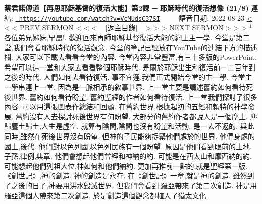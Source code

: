\documentclass{book}
\begin{document}
\section{}
\label{sec:VcMUdsC37SI}
\textbf{蔡君諾傳道【再思耶穌基督的復活大能】第2課 ─ 耶穌時代的復活想像 (21/8)}
\newline
\newline
連結: \href{https://youtube.com/watch?v=VcMUdsC37SI}{\texttt{ https://youtube.com/watch?v=VcMUdsC37SI}} ~~~~ 語音日期: 2022-08-23 
\newline
\newline
\hyperref[sec:MrgiW6jGDH4]{\small{< < < PREV SERMON < < <}}
~
\hyperref[sec:index]{\small{[返主目錄]}}
~
\hyperref[sec:A3YDD55lCCE]{\small{> > > NEXT SERMON > > >}}
\newline
\newline
$^{1}$各位弟兄姊妹,早晨!.
歡迎回來再師耶穌基督復活大能的網上主一學.
今堂是第二堂,我們會看耶穌時代的復活觀念.
今堂的筆記已經放在YouTube的連結下方的描述欄.
大家可以下載去看看今堂的內容.
今堂內容非常豐富,有三十多版的PowerPoint.
希望可以這一堂和大家去看看整個耶穌時代.
是關於耶穌出生和復活前一二百年到之後的時代.
人們如何去看待復活.
事不宜遲,我們正式開始今堂的主一學.
今堂主一學串連上一堂.
因為是一脈相承的敘事世界.
上一堂主要是講述舊約如何看待死後世界.
舊約如何看待盼望.
舊約聖經的作者如何看待復活.
上一堂我們探討了很多內容.
可以用這張圖表作總結和回顧.
在舊約世界,根據起初的五經和賴特的神學發展.
舊約沒有人去探討死後世界有何盼望.
大部分的舊約作者都說人是一個塵土.
塵歸塵土歸土,人生是虛空.
就算有陰間,陰間也沒有盼望和活動.
是一去不返的.
與此同時,雖然在死後世界沒有盼望.
但神的子民能夠捉緊他們處於的世界.
他們身處的國土,後代.
他們對以色列國,以色列民族有一個盼望.
原因是他們看到眼前的土地.
子孫,律例,典章.
他們會想起他們曾經和神納的約.
可能是在西太山和摩西納的約.
可能想起他們列祖大位,神如何和他們納約.
更加再推前一點的,就是聖經第一版.
《創世記》,神的創造.
神的創造是永存.
在《創世記》一章,就是神的創造.
雖然到了之後的日子,神要用洪水毀滅世界.
但我們會看到,羅亞帶來了第二次創造.
神是用羅亞這個人帶來第二次創造.
於是創造這個觀念都植入了猶太文化.
\end{document}
